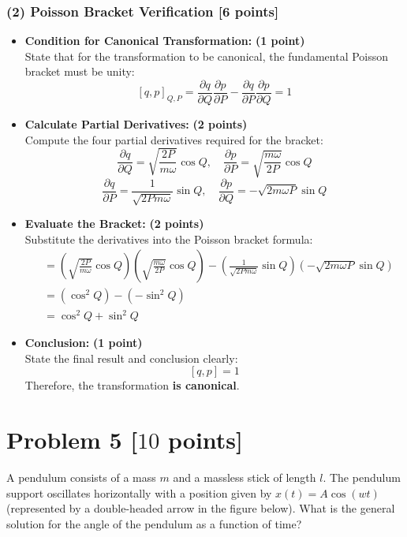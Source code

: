\documentclass[11pt, a4paper]{article} %
\begin{document}
\subsubsection*{(2) Poisson Bracket Verification [6 points]}
\begin{itemize}
    \item \textbf{Condition for Canonical Transformation:} \hfill \textbf{(1 point)} \\
    State that for the transformation to be canonical, the fundamental Poisson bracket must be unity:
    \[ [q, p]_{Q, P} = \frac{\partial q}{\partial Q}\frac{\partial p}{\partial P} - \frac{\partial q}{\partial P}\frac{\partial p}{\partial Q} = 1 \]

    \item \textbf{Calculate Partial Derivatives:} \hfill \textbf{(2 points)} \\
    Compute the four partial derivatives required for the bracket:
    \[ \frac{\partial q}{\partial Q} = \sqrt{\frac{2P}{m\omega}}\cos Q, \quad \frac{\partial p}{\partial P} = \sqrt{\frac{m\omega}{2P}}\cos Q \]
    \[ \frac{\partial q}{\partial P} = \frac{1}{\sqrt{2Pm\omega}}\sin Q, \quad \frac{\partial p}{\partial Q} = -\sqrt{2m\omega P}\sin Q \]

    \item \textbf{Evaluate the Bracket:} \hfill \textbf{(2 points)} \\
    Substitute the derivatives into the Poisson bracket formula:
    \begin{align*}
        [q, p] &= \left(\sqrt{\frac{2P}{m\omega}}\cos Q\right)\left(\sqrt{\frac{m\omega}{2P}}\cos Q\right) - \left(\frac{1}{\sqrt{2Pm\omega}}\sin Q\right)\left(-\sqrt{2m\omega P}\sin Q\right) \\
        &= \left( \cos^2 Q \right) - \left( -\sin^2 Q \right) \\
        &= \cos^2 Q + \sin^2 Q
    \end{align*}

    \item \textbf{Conclusion:} \hfill \textbf{(1 point)} \\
    State the final result and conclusion clearly:
    \[ [q, p] = 1 \]
    Therefore, the transformation \textbf{is canonical}.
\end{itemize}

\newpage
\section*{Problem 5 [$10$ points]}
A pendulum consists of a mass $m$ and a massless stick of length $l$. The pendulum support oscillates horizontally with a position given by $x(t) = A \cos(wt)$ (represented by a double-headed arrow in the figure below). What is the general solution for the angle of the pendulum as a function of time?
\end{document}
